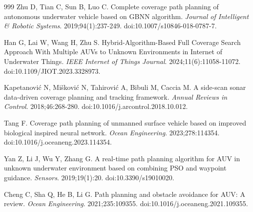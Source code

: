 \documentclass[jmse,article,submit,moreauthors]{Definitions/mdpi}
\begin{document}
\begin{thebibliography}{999}
Zhu D, Tian C, Sun B, Luo C. Complete coverage path planning of autonomous underwater vehicle based on GBNN algorithm. \textit{Journal of Intelligent \& Robotic Systems}. 2019;94(1):237-249. doi:10.1007/s10846-018-0787-7.

Han G, Lai W, Wang H, Zhu S. Hybrid-Algorithm-Based Full Coverage Search Approach With Multiple AUVs to Unknown Environments in Internet of Underwater Things. \textit{IEEE Internet of Things Journal}. 2024;11(6):11058-11072. doi:10.1109/JIOT.2023.3328973.

Kapetanovi{\'c} N, Mi{\v{s}}kovi{\'c} N, Tahirovi{\'c} A, Bibuli M, Caccia M. A side-scan sonar data-driven coverage planning and tracking framework. \textit{Annual Reviews in Control}. 2018;46:268-280. doi:10.1016/j.arcontrol.2018.10.012.

Tang F. Coverage path planning of unmanned surface vehicle based on improved biological inspired neural network. \textit{Ocean Engineering}. 2023;278:114354. doi:10.1016/j.oceaneng.2023.114354.

Yan Z, Li J, Wu Y, Zhang G. A real-time path planning algorithm for AUV in unknown underwater environment based on combining PSO and waypoint guidance. \textit{Sensors}. 2019;19(1):20. doi:10.3390/s19010020.

Cheng C, Sha Q, He B, Li G. Path planning and obstacle avoidance for AUV: A review. \textit{Ocean Engineering}. 2021;235:109355. doi:10.1016/j.oceaneng.2021.109355.

\end{thebibliography}
\end{document}
